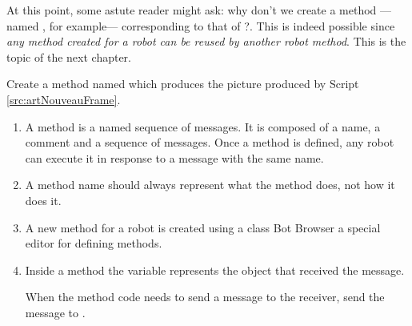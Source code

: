 At this point, some astute reader might ask: why don't we create a
method ---named , for example--- corresponding to
that of ?. This is indeed possible
since \emph{any method created for a robot can be reused
by another robot method}. This is the topic of the next chapter. 

\begin{exonofig} \label{exo:artNouveauFrame50}
Create a method named  which produces the picture produced by Script \ref{src:artNouveauFrame}. 
\end{exonofig}


\summa

\begin{enumerate}
\item A method is a named sequence of messages. It is composed of
a name, a comment and a sequence of messages. Once a method is defined, any robot can execute it in response to a message with the same name.

\item A method name should always represent what the method does, not how it does it. 

\item A new method for a robot is created using a class Bot Browser \ie a special 
editor for defining methods. 

\item Inside a method the variable  represents the 
object that received the message. 

When the method code needs to send a message to the receiver, send the message to \self.
\end{enumerate}


